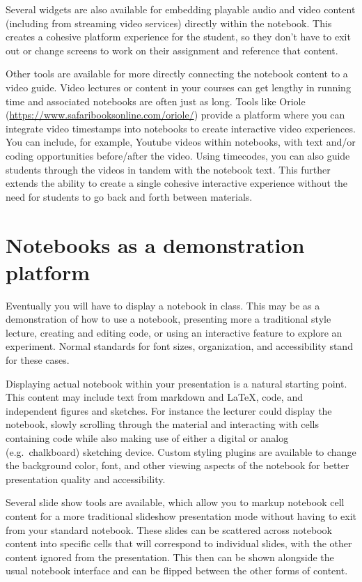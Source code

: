 \documentclass[]{book}
\begin{document}
Several widgets are also available for embedding playable audio and
video content (including from streaming video services) directly within
the notebook. This creates a cohesive platform experience for the
student, so they don't have to exit out or change screens to work on
their assignment and reference that content.

Other tools are available for more directly connecting the notebook
content to a video guide. Video lectures or content in your courses can
get lengthy in running time and associated notebooks are often just as
long. Tools like Oriole
(\url{https://www.safaribooksonline.com/oriole/}) provide a platform
where you can integrate video timestamps into notebooks to create
interactive video experiences. You can include, for example, Youtube
videos within notebooks, with text and/or coding opportunities
before/after the video. Using timecodes, you can also guide students
through the videos in tandem with the notebook text. This further
extends the ability to create a single cohesive interactive experience
without the need for students to go back and forth between materials.

\section{Notebooks as a demonstration
platform}\label{notebooks-as-a-demonstration-platform}

Eventually you will have to display a notebook in class. This may be as
a demonstration of how to use a notebook, presenting more a traditional
style lecture, creating and editing code, or using an interactive
feature to explore an experiment. Normal standards for font sizes,
organization, and accessibility stand for these cases.

Displaying actual notebook within your presentation is a natural
starting point. This content may include text from markdown and LaTeX,
code, and independent figures and sketches. For instance the lecturer
could display the notebook, slowly scrolling through the material and
interacting with cells containing code while also making use of either a
digital or analog (e.g.~chalkboard) sketching device. Custom styling
plugins are available to change the background color, font, and other
viewing aspects of the notebook for better presentation quality and
accessibility.

Several slide show tools are available, which allow you to markup
notebook cell content for a more traditional slideshow presentation mode
without having to exit from your standard notebook. These slides can be
scattered across notebook content into specific cells that will
correspond to individual slides, with the other content ignored from the
presentation. This then can be shown alongside the usual notebook
interface and can be flipped between the other forms of content.
\end{document}
